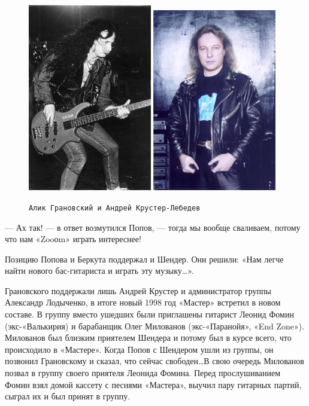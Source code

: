\documentclass[16pt,a5paper]{book}
\begin{document}
\begin{figure}[h]
    \centering
    \includegraphics[width=0.48\textwidth]{Image31}
    \hfill
    \includegraphics[width=0.48\textwidth]{Image32}
    \caption{\texttt{Алик Грановский и Андрей Крустер-Лебедев}}
\end{figure}

— Ах так! — в ответ возмутился Попов, — тогда мы вообще сваливаем, потому что нам «Zooоm» играть интереснее!

Позицию Попова и Беркута поддержал и Шендер. Они решили: «Нам легче найти нового бас-гитариста и играть эту
музыку\ldots».

Грановского поддержали лишь Андрей Крустер и администратор группы Александр Лодыченко, в итоге новый 1998 год «Мастер»
встретил в новом составе. В группу вместо ушедших были приглашены гитарист Леонид Фомин (экс-«Валькирия) и барабанщик
Олег Милованов (экс-«Паранойя», «End Zone»). Милованов был близким приятелем Шендера и потому был в курсе всего, что
происходило в «Мастере». Когда Попов с Шендером ушли из группы, он позвонил Грановскому и сказал, что сейчас
свободен\ldots В свою очередь Милованов позвал в группу своего приятеля Леонида Фомина. Перед прослушиванием Фомин взял
домой кассету с песнями «Мастера», выучил пару гитарных партий, сыграл их и был принят в группу.
\end{document}
